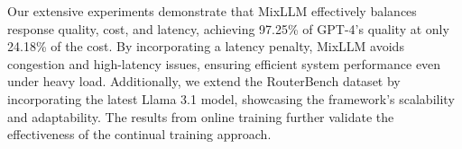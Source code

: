 
Our extensive experiments demonstrate that MixLLM effectively balances response quality, cost, and latency, achieving 97.25\% of GPT-4's quality at only 24.18\% of the cost. By incorporating a latency penalty, MixLLM avoids congestion and high-latency issues, ensuring efficient system performance even under heavy load. Additionally, we extend the RouterBench dataset by incorporating the latest Llama 3.1 model, showcasing the framework's scalability and adaptability. The results from online training further validate the effectiveness of the continual training approach.


